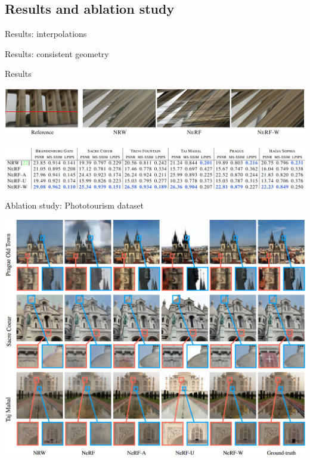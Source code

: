 \documentclass[aspectratio=1610]{beamer}
\begin{document}
\subsection{Results and ablation study}
\begin{frame}{Results: interpolations}
    \begin{figure}[H]
    \end{figure}
\end{frame}
\begin{frame}{Results: consistent geometry}
    \begin{figure}[H]
    \end{figure}
\end{frame}
\begin{frame}{Results}
    \begin{center}
        \includegraphics[width=\textwidth]{epipolar.png}
    \end{center}
    \bigskip
    \pause
    \begin{center}
        \includegraphics[width=\textwidth]{table.png}
    \end{center}
\end{frame}
\begin{frame}{Ablation study: Phototourism dataset}
    \begin{center}
        \includegraphics[width=.69\textwidth]{res-photo.png}
    \end{center}
\end{frame}
\end{document}
